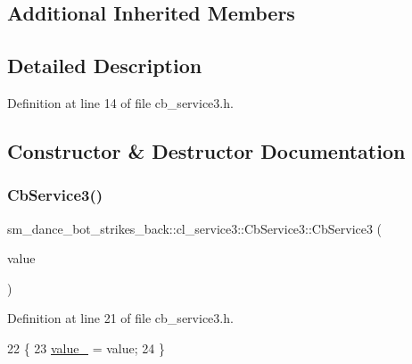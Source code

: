 \subsection*{Additional Inherited Members}


\subsection{Detailed Description}


Definition at line 14 of file cb\+\_\+service3.\+h.



\subsection{Constructor \& Destructor Documentation}
\mbox{\label{classsm__dance__bot__strikes__back_1_1cl__service3_1_1CbService3_a2d571bbec8f1d3d14a0e31446d3633b7}} 
\subsubsection{\texorpdfstring{Cb\+Service3()}{CbService3()}}
{\footnotesize\ttfamily sm\+\_\+dance\+\_\+bot\+\_\+strikes\+\_\+back\+::cl\+\_\+service3\+::\+Cb\+Service3\+::\+Cb\+Service3 (\begin{DoxyParamCaption}\item[{\hyperlink{namespacesm__dance__bot__strikes__back_1_1cl__service3_ac2ccf5d911840620cf8d0443c29d8b6b}{Service3\+Command}}]{value }\end{DoxyParamCaption})\hspace{0.3cm}{\ttfamily [inline]}}



Definition at line 21 of file cb\+\_\+service3.\+h.


\begin{DoxyCode}
22   \{
23     \hyperlink{classsm__dance__bot__strikes__back_1_1cl__service3_1_1CbService3_a76973df60e0e3ed7d7c270d0701b8f9d}{value\_} = value;
24   \}
\end{DoxyCode}


